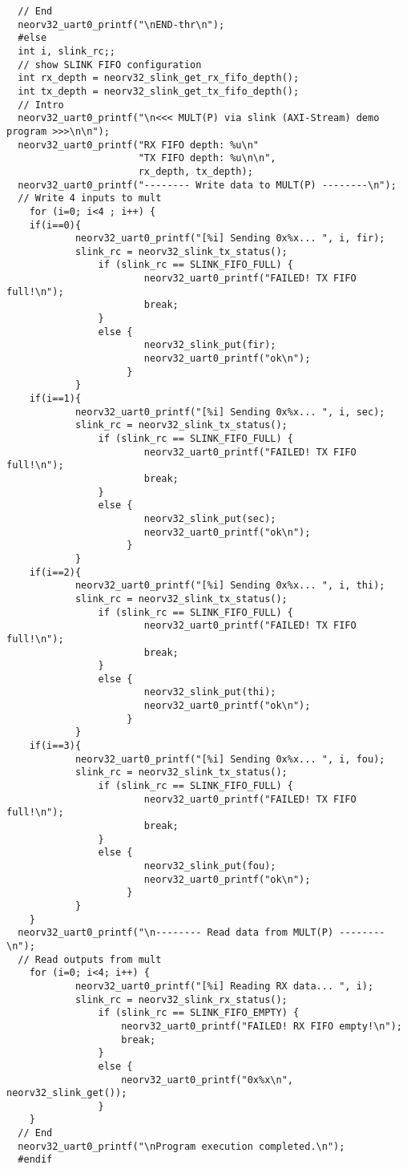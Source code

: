 \begin{code}
\begin{verbatim}
  // End
  neorv32_uart0_printf("\nEND-thr\n");
  #else
  int i, slink_rc;;
  // show SLINK FIFO configuration
  int rx_depth = neorv32_slink_get_rx_fifo_depth();
  int tx_depth = neorv32_slink_get_tx_fifo_depth();
  // Intro
  neorv32_uart0_printf("\n<<< MULT(P) via slink (AXI-Stream) demo program >>>\n\n");
  neorv32_uart0_printf("RX FIFO depth: %u\n"
                       "TX FIFO depth: %u\n\n",
                       rx_depth, tx_depth);
  neorv32_uart0_printf("-------- Write data to MULT(P) --------\n");
  // Write 4 inputs to mult
    for (i=0; i<4 ; i++) {
    if(i==0){
            neorv32_uart0_printf("[%i] Sending 0x%x... ", i, fir);
            slink_rc = neorv32_slink_tx_status();
                if (slink_rc == SLINK_FIFO_FULL) {
                        neorv32_uart0_printf("FAILED! TX FIFO full!\n");
                        break;
                }
                else {
                        neorv32_slink_put(fir);
                        neorv32_uart0_printf("ok\n");
                     }
            } 
    if(i==1){
            neorv32_uart0_printf("[%i] Sending 0x%x... ", i, sec);
            slink_rc = neorv32_slink_tx_status();
                if (slink_rc == SLINK_FIFO_FULL) {
                        neorv32_uart0_printf("FAILED! TX FIFO full!\n");
                        break;
                }
                else {
                        neorv32_slink_put(sec);
                        neorv32_uart0_printf("ok\n");
                     }
            }   
    if(i==2){
            neorv32_uart0_printf("[%i] Sending 0x%x... ", i, thi);
            slink_rc = neorv32_slink_tx_status();
                if (slink_rc == SLINK_FIFO_FULL) {
                        neorv32_uart0_printf("FAILED! TX FIFO full!\n");
                        break;
                }
                else {
                        neorv32_slink_put(thi);
                        neorv32_uart0_printf("ok\n");
                     }
            }   
    if(i==3){
            neorv32_uart0_printf("[%i] Sending 0x%x... ", i, fou);
            slink_rc = neorv32_slink_tx_status();
                if (slink_rc == SLINK_FIFO_FULL) {
                        neorv32_uart0_printf("FAILED! TX FIFO full!\n");
                        break;
                }
                else {
                        neorv32_slink_put(fou);
                        neorv32_uart0_printf("ok\n");
                     }
            }   
    } 
  neorv32_uart0_printf("\n-------- Read data from MULT(P) --------\n");
  // Read outputs from mult
    for (i=0; i<4; i++) {
            neorv32_uart0_printf("[%i] Reading RX data... ", i);
            slink_rc = neorv32_slink_rx_status();
                if (slink_rc == SLINK_FIFO_EMPTY) {
                    neorv32_uart0_printf("FAILED! RX FIFO empty!\n");
                    break;
                }
                else {  
                    neorv32_uart0_printf("0x%x\n", neorv32_slink_get());
                }
    }
  // End
  neorv32_uart0_printf("\nProgram execution completed.\n");
  #endif


\end{verbatim}
\end{code}
